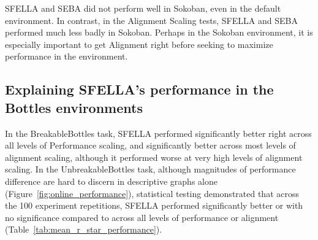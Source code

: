SFELLA and SEBA did not perform well in Sokoban, even in the default environment. In contrast, in the Alignment Scaling tests, SFELLA and SEBA performed much less badly in Sokoban. Perhaps in the Sokoban environment, it is especially important to get Alignment right before seeking to maximize performance in the environment.

\subsection{Explaining SFELLA's performance in the Bottles environments}


In the BreakableBottles task, SFELLA performed significantly better right across all levels of Performance scaling, and significantly better across most levels of alignment scaling, although it performed worse at very high levels of alignment scaling. In the UnbreakableBottles task, although magnitudes of performance difference are hard to discern in descriptive graphs alone (Figure~\ref{fig:online_performance}), statistical testing demonstrated that across the 100 experiment repetitions, SFELLA performed significantly better or with no significance compared to  \tloA{} across all levels of performance or alignment (Table~\ref{tab:mean_r_star_performance}).


